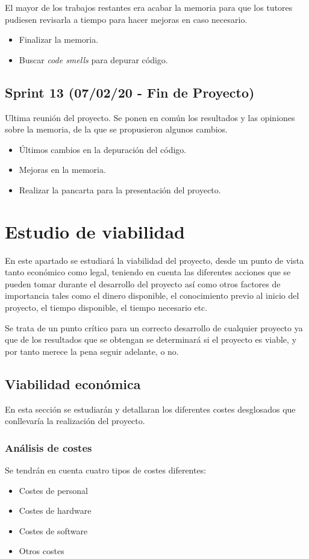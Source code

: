 El mayor de los trabajos restantes era acabar la memoria para que los tutores pudiesen revisarla a tiempo para hacer mejoras en caso necesario.

\begin{itemize}
\item Finalizar la memoria.
\item Buscar \textit{code smells} para depurar código.
\end{itemize}
\subsection{Sprint 13 (07/02/20 - Fin de Proyecto)}
Ultima reunión del proyecto. Se ponen en común los resultados y las opiniones sobre la memoria, de la que se propusieron algunos cambios.
\begin{itemize}
\item Últimos cambios en la depuración del código.
\item Mejoras en la memoria.
\item Realizar la pancarta para la presentación del proyecto.
\end{itemize}
\section{Estudio de viabilidad}
En este apartado se estudiará la viabilidad del proyecto, desde un punto de vista tanto económico como legal, teniendo en cuenta las diferentes acciones que se pueden tomar durante el desarrollo del proyecto así como otros factores de importancia tales como el dinero disponible, el conocimiento previo al inicio del proyecto, el tiempo disponible, el tiempo necesario etc.

Se trata de un punto crítico para un correcto desarrollo de cualquier proyecto ya que de los resultados que se obtengan se determinará si el proyecto es viable, y por tanto merece la pena seguir adelante, o no.
\subsection{Viabilidad económica}
En esta sección se estudiarán y detallaran los diferentes costes desglosados que conllevaría la realización del proyecto.
\subsubsection{Análisis de costes}
Se tendrán en cuenta cuatro tipos de costes diferentes:
\begin{itemize}
\item Costes de personal
\item Costes de hardware
\item Costes de software
\item Otros costes
\end{itemize}


